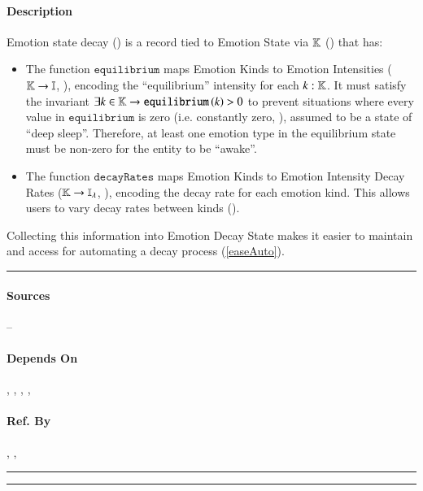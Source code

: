 \paragraph{Description} Emotion state decay () is a
record tied to Emotion State via $\mathbb{K}$ ()
that has:
\begin{itemize}

    \item The function $\mathtt{equilibrium}$ maps Emotion Kinds to Emotion
    Intensities ($\mathbb{K} \rightarrow \mathbb{I}$,
    ), encoding the ``equilibrium'' intensity for
    each $k : \mathbb{K}$. It must satisfy the invariant $\exists k \in
    \mathbb{K} \rightarrow \mathtt{equilibrium}\left(k\right) > 0$ to
    prevent situations where every value in $\mathtt{equilibrium}$ is zero (i.e.
    constantly zero, ), assumed to be a state of
    ``deep sleep''. Therefore, at least one emotion type in the equilibrium
    state must be non-zero for the entity to be ``awake''.

    \item The function $\mathtt{decayRates}$ maps Emotion Kinds to Emotion
    Intensity Decay Rates ($\mathbb{K} \rightarrow \mathbb{I_{\lambda}}$,
    ), encoding the decay rate for each emotion kind.
    This allows users to vary decay rates between kinds
    ().

\end{itemize}

Collecting this information into Emotion Decay State makes it easier to
maintain and access for automating a decay process (\ref{easeAuto}). \\\hrule

\paragraph{Sources} --

\paragraph{Depends On} , ,
, , 

\paragraph{Ref. By} ,
, 
\\\hrule\vspace{0.5mm}\hrule

